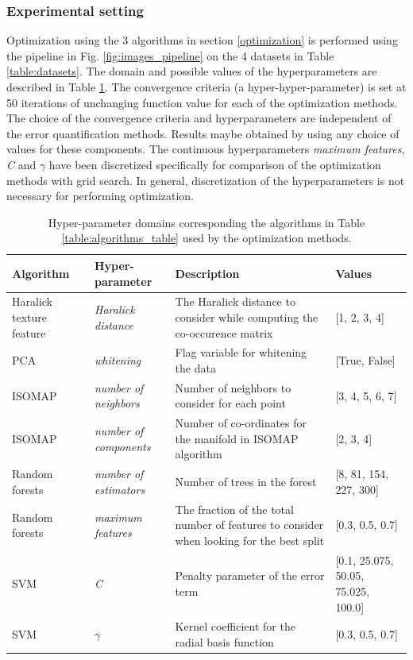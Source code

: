 \subsubsection{Experimental setting}
Optimization using the 3 algorithms in section \ref{optimization} is performed using the pipeline in Fig. \ref{fig:images_pipeline} on the 4 datasets in Table \ref{table:datasets}. The domain and possible values of the hyperparameters are described in Table \ref{table:hyper}. 
The convergence criteria (a hyper-hyper-parameter) is set at 50 iterations of unchanging  function value for each of the optimization methods. The choice of the convergence criteria and hyperparameters are independent of the error quantification methods. Results maybe obtained by using any choice of values for these components. The continuous hyperparameters \textit{maximum features}, \textit{C} and $\gamma$ have been discretized specifically for comparison of the optimization methods with grid search. In general, discretization of the hyperparameters is not necessary for performing optimization.
\begin{table}[ht!]
\centering
\caption{Hyper-parameter domains corresponding the algorithms in Table \ref{table:algorithms_table} used by the optimization methods.}
\begin{tabularx}{\linewidth}{ |X|X|X|X| } 
 \hline
 Algorithm & Hyper-parameter & Description & Values \\ 
 \hline
 Haralick texture feature & \textit{Haralick distance} & The Haralick distance to consider while computing the co-occurence matrix & [1, 2, 3, 4]\\
 \hline
 PCA & \textit{whitening} & Flag variable for whitening the data & [True, False]\\
 \hline
  ISOMAP & \textit{number of neighbors} & Number of neighbors to consider for each point & [3, 4, 5, 6, 7] \\
 \hline
 ISOMAP & \textit{number of components} & Number of co-ordinates for the manifold in ISOMAP algorithm & [2, 3, 4]\\
 \hline
 Random forests & \textit{number of estimators} & Number of trees in the forest & [8,  81, 154, 227, 300]\\
 \hline
 Random forests & \textit{maximum features} & The fraction of the total number of features to consider when looking for the best split & [0.3, 0.5, 0.7]\\
 \hline
 SVM & \textit{C} & Penalty parameter of the error term & [0.1, 25.075, 50.05, 75.025, 100.0] \\
 \hline
 SVM & $\gamma$ & Kernel coefficient for the radial basis function & [0.3, 0.5, 0.7] \\
 \hline
 \end{tabularx}
 
\label{table:hyper}
\end{table}
